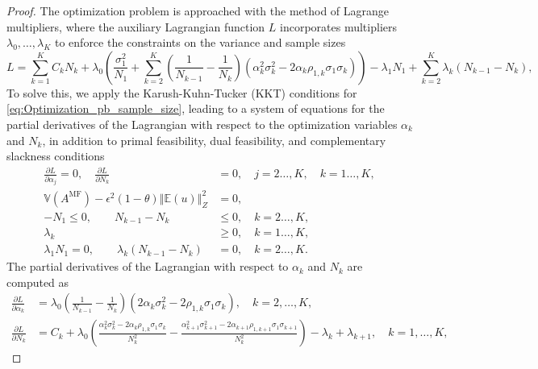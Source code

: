 \begin{proof}
The optimization problem is approached with the method of Lagrange multipliers, where the auxiliary Lagrangian function $L$ incorporates multipliers $\lambda_0,\ldots, \lambda_K$ to enforce the constraints on the variance and sample sizes
%
\[
L = \sum_{k=1}^K C_kN_k +\lambda_0 \left(\frac{\sigma_1^2}{N_1} + \sum_{k=2}^K \left(\frac{1}{N_{k-1}} - \frac{1}{N_k}\right)\left(\alpha_k^2\sigma_k^2 - 2\alpha_k\rho_{1,k}\sigma_1\sigma_k\right)\right)-\lambda_1 N_1+\sum_{k=2}^K\lambda_k(N_{k-1} - N_k),
\]
%
To solve this, we apply the Karush-Kuhn-Tucker (KKT) conditions for \eqref{eq:Optimization_pb_sample_size}, leading to a system of equations for the partial derivatives of the Lagrangian with respect to the optimization variables $\alpha_k$ and $N_k$,  in addition to  primal feasibility, dual feasibility, and complementary slackness conditions
%
\begin{align*}
\frac{\partial L}{\partial \alpha_j}=0,\quad \frac{\partial L}{\partial N_k}&=0,\quad j=2\ldots,K, \quad k=1\ldots,K,\\
\mathbb{V}\left(A^{\text{MF}}\right)- \epsilon^2(1-\theta)\left\Vert\mathbb{E}(u) \right\Vert_{Z}^2 &= 0,\\
   -N_1\le 0,\qquad N_{k-1}-N_k&\le 0, \quad k=2\ldots,K,\\
    \lambda_k &\ge 0,\quad k=1\ldots,K,\\ 
    \lambda_1 N_1=0,\qquad\lambda_k(N_{k-1}-N_k)&=0,\quad k=2\ldots,K.
\end{align*}
%
The partial derivatives of the Lagrangian with respect to $\alpha_k$ and $N_k$ are computed as
%
\begin{align*}
    \frac{\partial L}{\partial \alpha_k}&=\lambda_0\left(\frac{1}{N_{k-1}} - \frac{1}{N_k}\right)\left(2\alpha_k\sigma_k^2 - 2\rho_{1,k}\sigma_1\sigma_k\right),\quad k=2,\dots,K,\\
    \frac{\partial L}{\partial N_k}&=C_k+\lambda_0\left(\frac{\alpha_k^2\sigma_k^2 - 2\alpha_k\rho_{1,k}\sigma_1\sigma_k}{N_k^2}-\frac{\alpha_{k+1}^2\sigma_{k+1}^2 - 2\alpha_{k+1}\rho_{1,k+1}\sigma_1\sigma_{k+1}}{N_k^2}\right)-\lambda_k+\lambda_{k+1}, \quad k=1,\dots,K,

\end{align*}
\end{proof}
